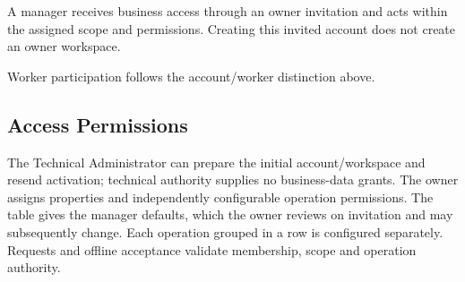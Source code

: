 A manager receives business access through an owner invitation and acts within the assigned scope and permissions. Creating this invited account does not create an owner workspace.

Worker participation follows the account/worker distinction above.


\subsection{Access Permissions}
\label{sec:permission-defaults}
The Technical Administrator can prepare the initial account/workspace and resend
activation; technical authority supplies no business-data grants. The owner assigns
properties and independently configurable operation permissions.
The table gives the manager defaults, which the owner reviews on invitation and
may subsequently change. Each operation grouped in a row is configured separately.
Requests and offline acceptance validate membership, scope and operation authority.

